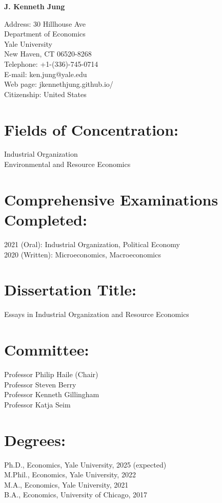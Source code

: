 \documentclass[11pt,letterpaper]{article}
\begin{document}
\begin{center}
{\Large \textbf{J. Kenneth Jung}}
\end{center}

\noindent Address: 30 Hillhouse Ave \\
Department of Economics \\
Yale University \\
New Haven, CT 06520-8268 \\
Telephone: +1-(336)-745-0714 \\
E-mail: ken.jung@yale.edu \\
Web page: jkennethjung.github.io/ \\
Citizenship: United States

\section*{Fields of Concentration:}
Industrial Organization \\
Environmental and Resource Economics

\section*{Comprehensive Examinations Completed:}
2021 (Oral): Industrial Organization, Political Economy \\
2020 (Written): Microeconomics, Macroeconomics

\section*{Dissertation Title:} 
Essays in Industrial Organization and Resource Economics

\section*{Committee:}
Professor Philip Haile (Chair) \\
Professor Steven Berry \\
Professor Kenneth Gillingham \\
Professor Katja Seim

\section*{Degrees:}
Ph.D., Economics, Yale University, 2025 (expected) \\
M.Phil., Economics, Yale University, 2022 \\
M.A., Economics, Yale University, 2021 \\
B.A., Economics, University of Chicago, 2017
\end{document}
